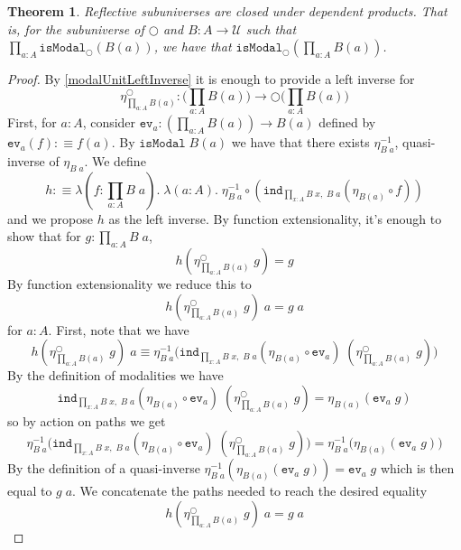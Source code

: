 \documentclass[12pt]{report}
\newtheorem{thm}{Theorem}[section]
\theoremstyle{definition}
\begin{document}
\begin{thm}\label{reflSubuniversePiTypes}
Reflective subuniverses are closed under dependent products.
That is, for the subuniverse of $\bigcirc$ and $B : A \rightarrow \mathcal{U}$ such that\\
$\prod_{a : A}\mathtt{isModal}_{\bigcirc}(B(a))$, we have that $\mathtt{isModal}_{\bigcirc}(\prod_{a : A} B(a))$. 
\end{thm}

\begin{proof}
By \ref{modalUnitLeftInverse} it is enough to provide a left inverse for 
$$\eta^\bigcirc_{\prod_{a : A} B(a)} : \Big(\prod_{a : A} B(a)\Big) \rightarrow \bigcirc \Big( \prod_{a : A} B(a) \Big)$$
First, for $a : A$, consider $\mathtt{ev}_a: (\prod_{a: A}B(a)) \rightarrow B(a)$ defined by $\mathtt{ev}_a (f) : \equiv f(a)$. 
By $\mathtt{isModal}\; B(a)$ we have that there exists $\eta_{B\;a}^{-1}$, quasi-inverse of $\eta_{B\;a}$. 
We define 
$$h :\equiv \lambda(f : \prod_{a : A}B\;a).\;\lambda(a : A).\; \eta_{B\;a}^{-1}\circ (\mathtt{ind}_{\prod_{x :A}B\;x,\;B\;a}(\eta_{B(a)} \circ f))$$
and we propose $h$ as the left inverse. 
By function extensionality, it's enough to show that for $g : \prod_{a:A}B\;a$, 
$$h(\eta^\bigcirc_{\prod_{a : A} B(a)}\; g) = g$$
By function extensionality we reduce this to
$$h(\eta^\bigcirc_{\prod_{a : A} B(a)}\; g)\;a = g\;a$$
for $a :A$. 
First, note that we have 
$$h(\eta^\bigcirc_{\prod_{a : A} B(a)}\; g)\;a \equiv \eta_{B\;a}^{-1}\big(\mathtt{ind}_{\prod_{x :A}B\;x,\;B\;a}(\eta_{B(a)} \circ \mathtt{ev}_a)\; (\eta^\bigcirc_{\prod_{a : A} B(a)}\; g)\big)$$
By the definition of modalities we have
$$\mathtt{ind}_{\prod_{x :A}B\;x,\;B\;a}(\eta_{B(a)} \circ \mathtt{ev}_a)\; (\eta^\bigcirc_{\prod_{a : A} B(a)}\; g) = \eta_{B(a)}(\mathtt{ev}_a\; g)$$
so by action on paths we get
$$\eta_{B\;a}^{-1}\big(\mathtt{ind}_{\prod_{x :A}B\;x,\;B\;a}(\eta_{B(a)} \circ \mathtt{ev}_a)\; (\eta^\bigcirc_{\prod_{a : A} B(a)}\; g)\big) = \eta_{B\;a}^{-1}\big( \eta_{B(a)}(\mathtt{ev}_a\; g) \big)$$
By the definition of a quasi-inverse $\eta_{B\;a}^{-1}( \eta_{B(a)}(\mathtt{ev}_a\; g) ) = \mathtt{ev}_a\;g$ which is then equal to $g\;a$. 
We concatenate the paths needed to reach the desired equality
$$h(\eta^\bigcirc_{\prod_{a : A} B(a)}\; g)\;a = g\;a$$

\end{proof}
\end{document}
